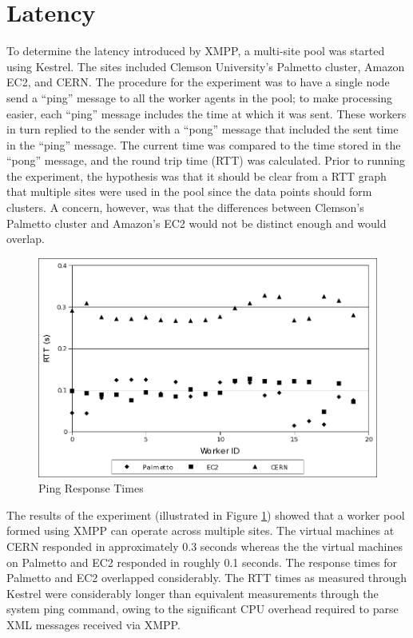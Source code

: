 \section{Latency}
\label{sub:Latency}To determine the latency introduced by XMPP, a
multi-site pool was started using Kestrel. The sites included Clemson
University's Palmetto cluster, Amazon EC2, and CERN. The procedure
for the experiment was to have a single node send a ``ping'' message
to all the worker agents in the pool; to make processing easier, each
``ping'' message includes the time at which it was sent. These
workers in turn replied to the sender with a ``pong'' message
that included the sent time in the ``ping'' message. The current
time was compared to the time stored in the ``pong'' message,
and the round trip time (RTT) was calculated. Prior to running the
experiment, the hypothesis was that it should be clear from a RTT
graph that multiple sites were used in the pool since the data points
should form clusters. A concern, however, was that the differences
between Clemson's Palmetto cluster and Amazon's EC2 would not be distinct
enough and would overlap.

\begin{figure}
\includegraphics[width=\columnwidth]{figures/xmpp_rtt}
\caption{\label{fig:Ping-Response-Times}Ping Response Times}
\end{figure}

The results of the experiment (illustrated in Figure \ref{fig:Ping-Response-Times})
showed that a worker pool formed using XMPP can operate across multiple
sites. The virtual machines at CERN responded in approximately 0.3
seconds whereas the the virtual machines on Palmetto and EC2 responded
in roughly 0.1 seconds. The response times for Palmetto and EC2 overlapped
considerably. The RTT times as measured through Kestrel were considerably
longer than equivalent measurements through the system ping command,
owing to the significant CPU overhead required to parse XML messages
received via XMPP.

